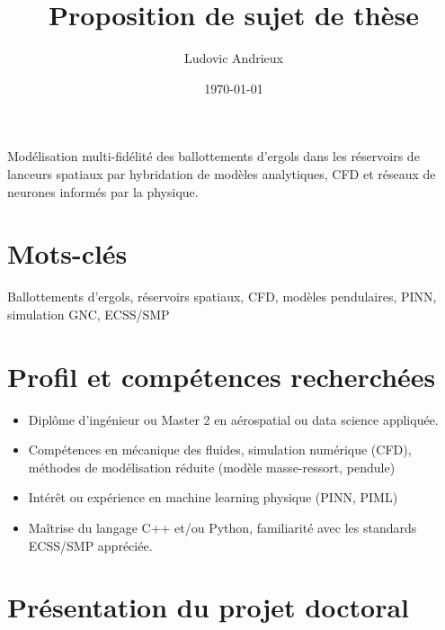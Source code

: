 \documentclass[12pt]{article}
\title{Proposition de sujet de thèse}
\author{Ludovic Andrieux}
\date{\today}
\begin{document}
	\maketitle
	
	\begin{tcolorbox}[colback=gray!0, colframe=black, sharp corners, boxrule=0.5pt]
	Modélisation multi-fidélité des ballottements d’ergols dans les réservoirs de lanceurs spatiaux par hybridation de modèles analytiques, CFD et réseaux de neurones informés par la physique.
	\end{tcolorbox}
	
	\section*{Mots-clés}
	
	Ballottements d'ergols, réservoirs spatiaux, CFD, modèles pendulaires, PINN, simulation GNC, ECSS/SMP
	
	\section*{Profil et compétences recherchées}
	
	\begin{itemize}
		\item Diplôme d’ingénieur ou Master 2 en aérospatial ou data science appliquée.
		
		\item Compétences en mécanique des fluides, simulation numérique (CFD), méthodes de modélisation réduite (modèle masse-ressort, pendule)
		
		\item Intérêt ou expérience en machine learning physique (PINN, PIML)
		
		\item Maîtrise du langage C++ et/ou Python, familiarité avec les standards ECSS/SMP appréciée.
	\end{itemize}
	
	
	\section*{Présentation du projet doctoral}
	
\end{document}
